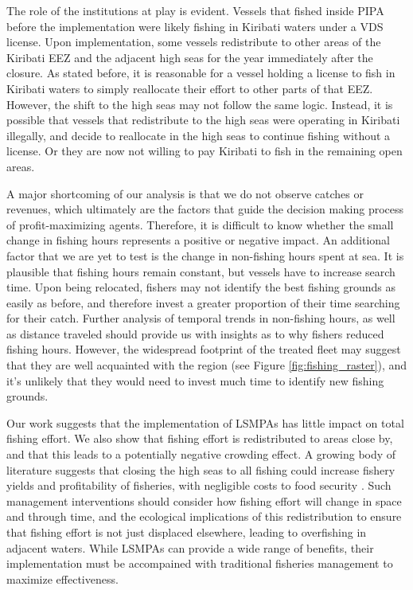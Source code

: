 \documentclass[9pttwoside,lineno]{pnas-new}
\begin{document}
The role of the institutions at play is evident. Vessels that fished
inside PIPA before the implementation were likely fishing in
Kiribati waters under a VDS license. Upon implementation,
some vessels redistribute to other areas of the Kiribati EEZ and the adjacent
high seas for the year immediately after the closure. As stated before,
it is reasonable for a vessel holding a license to fish in Kiribati
waters to simply reallocate their effort to other parts of that EEZ.
However, the shift to the high seas may not follow the same logic.
Instead, it is possible that vessels that redistribute to the high seas
were operating in Kiribati illegally, and decide to reallocate in the
high seas to continue fishing without a license. Or they are now not willing to pay Kiribati to fish in the remaining open areas.

A major shortcoming of our analysis is that we do not observe catches or
revenues, which ultimately are the factors that guide the decision
making process of profit-maximizing agents. Therefore, it is difficult
to know whether the small change in fishing hours represents a positive or
negative impact. An additional factor that we are yet to test is the
change in non-fishing hours spent at sea. It is plausible that fishing
hours remain constant, but vessels have to increase search time. Upon
being relocated, fishers may not identify the best fishing grounds as
easily as before, and therefore invest a greater proportion of their
time searching for their catch. Further analysis of temporal trends in
non-fishing hours, as well as distance traveled should provide us with
insights as to why fishers reduced fishing hours. However, the
widespread footprint of the treated fleet may suggest that they are well
acquainted with the region (see Figure \ref{fig:fishing_raster}), and it's
unlikely that they would need to invest much time to identify new fishing grounds.

Our work suggests that the implementation of LSMPAs has little impact on
total fishing effort. We also show that fishing effort is
redistributed to areas close by, and that this leads to a potentially
negative crowding effect. A growing body of literature suggests that
closing the high seas to all fishing could increase fishery yields and
profitability of fisheries, with negligible costs to food security
\citep{white_2014,sumaila_2015,sala_2018a,schiller_2018}. Such
management interventions should consider how fishing effort will change
in space and through time, and the ecological implications of this
redistribution to ensure that fishing effort is not just displaced
elsewhere, leading to overfishing in adjacent waters. While LSMPAs can
provide a wide range of benefits, their implementation must be
accompained with traditional fisheries management to maximize
effectiveness.
\end{document}
